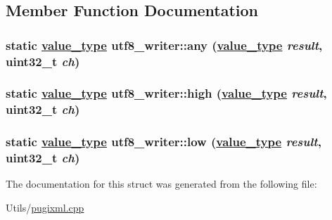 \subsection{Member Function Documentation}
\hypertarget{structutf8__writer_288e9c5f3720b95ae6b77330ad38dd56}{
\subsubsection[any]{\setlength{\rightskip}{0pt plus 5cm}static \hyperlink{structutf8__writer_f25ec3c651f9a4a3f193573a4e95002b}{value\_\-type} utf8\_\-writer::any (\hyperlink{structutf8__writer_f25ec3c651f9a4a3f193573a4e95002b}{value\_\-type} {\em result}, uint32\_\-t {\em ch})}}
\label{structutf8__writer_288e9c5f3720b95ae6b77330ad38dd56}


\hypertarget{structutf8__writer_c03dfaf797d599afdf0be7def86ff9b9}{
\subsubsection[high]{\setlength{\rightskip}{0pt plus 5cm}static \hyperlink{structutf8__writer_f25ec3c651f9a4a3f193573a4e95002b}{value\_\-type} utf8\_\-writer::high (\hyperlink{structutf8__writer_f25ec3c651f9a4a3f193573a4e95002b}{value\_\-type} {\em result}, uint32\_\-t {\em ch})}}
\label{structutf8__writer_c03dfaf797d599afdf0be7def86ff9b9}


\hypertarget{structutf8__writer_c4ec52da6f37225ba4fde259bff2f86c}{
\subsubsection[low]{\setlength{\rightskip}{0pt plus 5cm}static \hyperlink{structutf8__writer_f25ec3c651f9a4a3f193573a4e95002b}{value\_\-type} utf8\_\-writer::low (\hyperlink{structutf8__writer_f25ec3c651f9a4a3f193573a4e95002b}{value\_\-type} {\em result}, uint32\_\-t {\em ch})}}
\label{structutf8__writer_c4ec52da6f37225ba4fde259bff2f86c}




The documentation for this struct was generated from the following file:\begin{CompactItemize}
\item 
Utils/\hyperlink{pugixml_8cpp}{pugixml.cpp}\end{CompactItemize}
